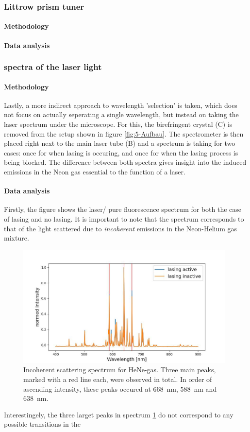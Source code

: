 \documentclass[../main.tex]{subfiles}
\begin{document}
\subsubsection{Littrow prism tuner}
    \paragraph{Methodology}
    \paragraph{Data analysis}

\subsubsection{spectra of the laser light}
    \paragraph{Methodology}
    Lastly, a more indirect approach to wavelength 'selection' is taken, which does not focus on actually seperating a single wavelength, but instead on taking the laser spectrum under the microscope. For this, the birefringent crystal (C) is removed from the setup shown in figure \ref{fig:5-Aufbau}. The spectrometer is then placed right next to the main laser tube (B) and a spectrum is taking for two cases: once for when lasing is occuring, and once for when the lasing process is being blocked. The difference between both spectra gives insight into the induced emissions in the Neon gas essential to the function of a laser.

    \paragraph{Data analysis}

    Firstly, the figure shows the laser/ pure fluorescence spectrum for both the case of lasing and no lasing. It is important to note that the spectrum corresponds to that of the light scattered due to \textit{incoherent} emissions in the Neon-Helium gas mixture.

    \begin{figure}[H]
        \centering 
        \includegraphics[width = 11cm]{Bilddateien/5-NeonSpektren.jpg}
        \caption{Incoherent scattering spectrum for HeNe-gas. Three main peaks, marked with a red line each, were observed in total. In order of ascending intensity, these peaks occured at \SI{668}{\nm}, \SI{588}{\nm} and \SI{638}{\nm}.}
        \label{fig:5-NeonSpektren}
    \end{figure}

    Interestingely, the three larget peaks in spectrum \ref{fig:5-NeonSpektren} do not correspond to any possible transitions in the 
\end{document}
